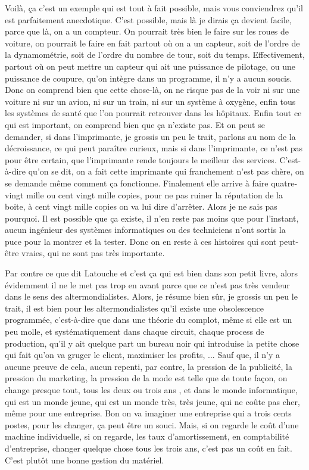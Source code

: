 \begin{description}
Voilà, ça c'est un exemple qui est tout à fait possible, mais vous conviendrez qu'il est parfaitement anecdotique. C'est possible, mais là je dirais ça devient facile, parce que là, on a un compteur. On pourrait très bien le faire sur les roues de voiture, on pourrait le faire en fait partout où on a un capteur, soit de l'ordre de la dynamométrie, soit de l'ordre du nombre de tour, soit du temps. Effectivement, partout où on peut mettre un capteur qui ait une puissance de pilotage, ou une puissance de coupure, qu'on intègre dans un programme, il n'y a aucun soucis. Donc on comprend bien que cette chose-là, on ne risque pas de la voir ni sur une voiture ni sur un avion, ni sur un train, ni sur un système à oxygène, enfin tous les systèmes de santé que l'on pourrait retrouver dans les hôpitaux. Enfin tout ce qui est important, on comprend bien que ça n'existe pas. Et on peut se demander, si dans l'imprimante, je grossis un peu le trait, parlons au nom de la décroissance, ce qui peut paraître curieux, mais si dans l'imprimante, ce n'est pas pour être certain, que l'imprimante rende toujours le meilleur des services. C'est-à-dire qu'on se dit, on a fait cette imprimante qui franchement n'est pas chère, on se demande même comment ça fonctionne. Finalement elle arrive à faire quatre-vingt mille ou cent vingt mille copies, pour ne pas ruiner la réputation de la boite, à cent vingt mille copies on va lui dire d'arrêter. Alors je ne sais pas pourquoi. Il est possible que ça existe, il n'en reste pas moins que pour l'instant, aucun ingénieur des systèmes informatiques ou des techniciens n'ont sortis la puce pour la montrer et la tester. Donc on en reste à ces histoires qui sont peut-être vraies, qui ne sont pas très importante. 

Par contre ce que dit Latouche et c'est ça qui est bien dans son petit livre, alors évidemment il ne le met pas trop en avant parce que ce n’est pas très vendeur dans le sens des altermondialistes. Alors, je résume bien sûr, je grossis un peu le trait, il est bien pour les altermondialistes qu'il existe une obsolescence programmée, c'est-à-dire que dans une théorie du complot, même si elle est un peu molle, et systématiquement dans chaque circuit, chaque process de production, qu'il y ait quelque part un bureau noir qui introduise la petite chose qui fait qu'on va gruger le client, maximiser les profits, ... 
Sauf que, il n'y a aucune preuve de cela, aucun repenti, par contre, la pression de la publicité, la pression du marketing, la pression de la mode est telle que de toute façon, on change presque tout, tous les deux ou trois ans , et dans le monde informatique, qui est un monde jeune, qui est un monde très, très jeune, qui ne coûte pas cher, même pour une entreprise. Bon on va imaginer une entreprise qui a trois cents postes, pour les changer, ça peut être un souci. Mais, si on regarde le coût d'une machine individuelle, si on regarde, les taux d'amortissement, en comptabilité d'entreprise, changer quelque chose tous les trois ans, c'est pas un coût en fait. C'est plutôt une bonne gestion du matériel.


\end{description}
